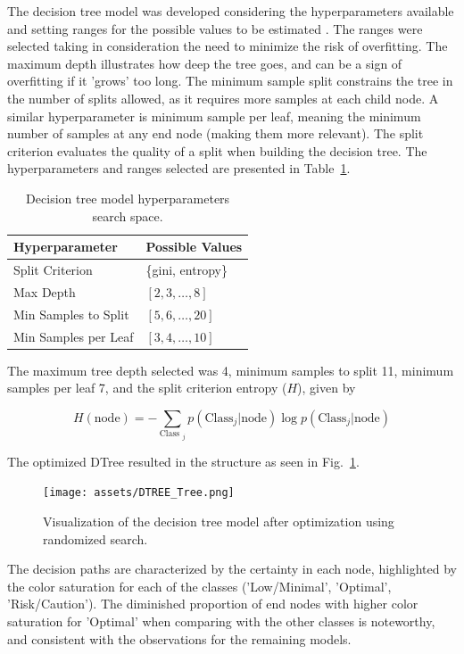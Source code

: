 \documentclass[conference]{IEEEtran}
\begin{document}
The decision tree model was developed considering the hyperparameters available and setting ranges for the possible values to be estimated \cite{dtree17}. The ranges were selected taking in consideration the need to minimize the risk of overfitting. The maximum depth illustrates how deep the tree goes, and can be a sign of overfitting if it 'grows' too long. The minimum sample split constrains the tree in the number of splits allowed, as it requires more samples at each child node. A similar hyperparameter is minimum sample per leaf, meaning the minimum number of samples at any end node (making them more relevant). The split criterion evaluates the quality of a split when building the decision tree. The hyperparameters and ranges selected are presented in Table~\ref{parametrosDTree}.

\begin{table}[H]
\centering
\caption{Decision tree model hyperparameters search space.}
\label{parametrosDTree}
\begin{tabular}{ll}
\toprule
\textbf{Hyperparameter} & \textbf{Possible Values} \\
\midrule
Split Criterion & \{gini, entropy\} \\ 
Max Depth & $[2, 3, \dots, 8]$ \\ 
Min Samples to Split & $[5, 6, \dots, 20]$ \\ 
Min Samples per Leaf & $[3, 4, \dots, 10]$ \\
\bottomrule
\end{tabular}
\end{table} %

The maximum tree depth selected was 4, minimum samples to split 11, minimum samples per leaf 7, and the split criterion entropy ($H$), given by

$$H(\text{node}) = - \sum_{\text{Class }_j} p(\text{Class}_j | \text{node}) \log p(\text{Class}_j | \text{node})$$

The optimized DTree resulted in the structure as seen in Fig.~\ref{dtree_tree}.

\begin{figure}[H]
    \centering
    \texttt{[image: assets/DTREE\_Tree.png]}
    \caption{Visualization of the decision tree model after optimization using randomized search.}
    \label{dtree_tree}
\end{figure} %

The decision paths are characterized by the certainty in each node, highlighted by the color saturation for each of the classes ('Low/Minimal', 'Optimal', 'Risk/Caution'). The diminished proportion of end nodes with higher color saturation for 'Optimal' when comparing with the other classes is noteworthy, and consistent with the observations for the remaining models.
\end{document}
